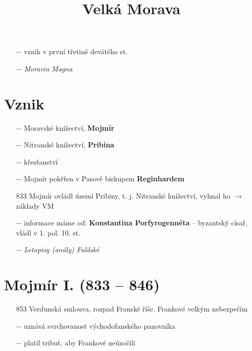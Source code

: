 \documentclass{article}
\title{\vspace{-2cm}Velká Morava\vspace{-1.7cm}}
\date{}
\author{}
\begin{document}
\maketitle
\begin{itemize}
    \vspace{-0.5em}
    \setlength\itemsep{0.15em}
    \item[$-$] vznik v první třetině devátého st.
    \item[$-$] \textit{Moravia Magna}
\end{itemize}

\section*{Vznik}
\begin{itemize}
    \vspace{-0.5em}
    \setlength\itemsep{0.15em}
    \item[$-$] Moravské knížectví, \textbf{Mojmír}
    \item[$-$] Nitranské knížectví, \textbf{Pribina}
    \item[$-$] křesťanství
    \item[$-$] Mojmír pokřťen v Pasově biskupem \textbf{Reginhardem}
    \item[833] Mojmír ovládl území Pribiny, t. j. Nitranské knížectví, vyhnal ho $\rightarrow$ základy VM
    \item[$-$] informace máme od: \textbf{Konstantina Porfyrogennéta} -- byzantský císař, vládl v 1. pol. 10. st.
    \item[$-$] \textit{Letopisy (anály) Fuldské}
\end{itemize}

\section*{Mojmír I. (833 -- 846)}
\begin{itemize}
    \vspace{-0.5em}
    \setlength\itemsep{0.15em}
    \item[853] Verdunská smlouva, rozpad Franské říše, Frankové velkým nebezpečím
    \item[$-$] uznává svrchovanost východofanského panovníka
    \item[$-$] platil tribut, aby Frankové neúzočili
\end{itemize}
\end{document}
